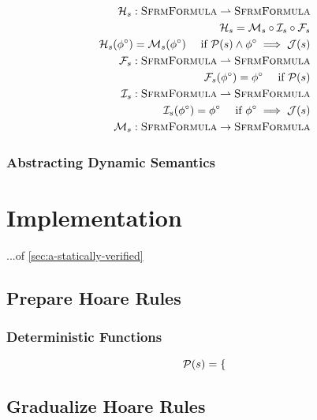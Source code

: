 \begin{align*}
\mathcal{H}_s : \textsc{SfrmFormula} \rightharpoonup \textsc{SfrmFormula}\\
\mathcal{H}_s = \mathcal{M}_s \circ \mathcal{I}_s \circ \mathcal{F}_s\\
\mathcal{H}_s({\phi}^{\circ}) = \mathcal{M}_s({\phi}^{\circ}) \quad\text{ if $\mathcal{P}(s) \wedge {\phi}^{\circ} \implies \mathcal{J}(s)$} \\
\mathcal{F}_s : \textsc{SfrmFormula} \rightharpoonup \textsc{SfrmFormula}\\
\mathcal{F}_s({\phi}^{\circ}) = {\phi}^{\circ} \quad\text{ if $\mathcal{P}(s)$} \\
\mathcal{I}_s : \textsc{SfrmFormula} \rightharpoonup \textsc{SfrmFormula}\\
\mathcal{I}_s({\phi}^{\circ}) = {\phi}^{\circ} \quad\text{ if ${\phi}^{\circ} \implies \mathcal{J}(s)$} \\
\mathcal{M}_s : \textsc{SfrmFormula} \rightarrow \textsc{SfrmFormula}\\
\end{align*}



\subsection{Abstracting Dynamic Semantics}

\chapter{Implementation}
...of \ref{sec:a-statically-verified}

\section{Prepare Hoare Rules}

\subsection{Deterministic Functions}
\begin{displaymath}
\mathcal{P}(s) =
\begin{cases}

\end{cases}
\end{displaymath}

\section{Gradualize Hoare Rules}

